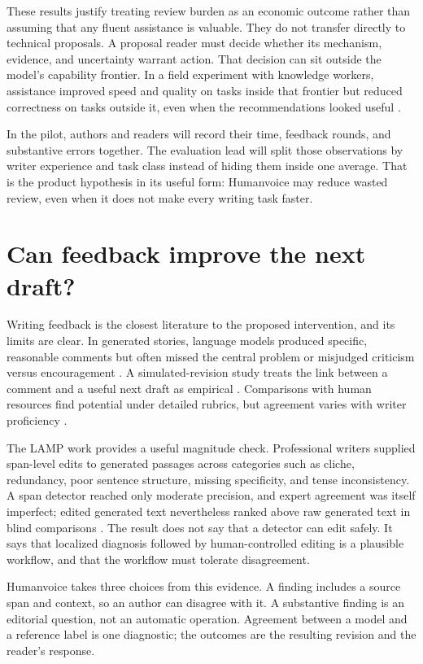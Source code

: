 These results justify treating review burden as an economic outcome rather than
assuming that any fluent assistance is valuable. They do not transfer directly
to technical proposals. A proposal reader must decide whether its mechanism,
evidence, and uncertainty warrant action. That decision can sit outside the model's capability
frontier. In a field experiment with knowledge workers, assistance improved
speed and quality on tasks inside that frontier but reduced correctness on
tasks outside it, even when the recommendations looked useful
\citep{dellacqua2026jagged}.

In the pilot, authors and readers will record their time, feedback rounds, and
substantive errors together. The evaluation lead will split those observations
by writer experience and task class instead of hiding them inside one average.
That is the product hypothesis in its useful form: Humanvoice may reduce wasted
review, even when it does not make every writing task faster.

\section{Can feedback improve the next draft?}

Writing feedback is the closest literature to the proposed intervention, and
its limits are clear. In generated stories, language models produced specific,
reasonable comments but often missed the central problem or misjudged criticism
versus encouragement \citep{rashkin2025story}. A simulated-revision study treats
the link between a comment and a useful next draft as empirical
\citep{nair2024closing}. Comparisons with human resources find potential under
detailed rubrics, but agreement varies with writer proficiency
\citep{behzad2024feedback}.

The LAMP work provides a useful magnitude check. Professional writers supplied
span-level edits to generated passages across categories such as cliche,
redundancy, poor sentence structure, missing specificity, and tense
inconsistency. A span detector reached only moderate precision, and expert
agreement was itself imperfect; edited generated text nevertheless ranked above
raw generated text in blind comparisons \citep{chakrabarty2024salvage}. The
result does not say that a detector can edit safely. It says that localized
diagnosis followed by human-controlled editing is a plausible workflow, and
that the workflow must tolerate disagreement.

Humanvoice takes three choices from this evidence. A finding includes a source
span and context, so an author can disagree with it. A substantive finding is
an editorial question, not an automatic operation. Agreement between a model
and a reference label is one diagnostic; the outcomes are the resulting
revision and the reader's response.

